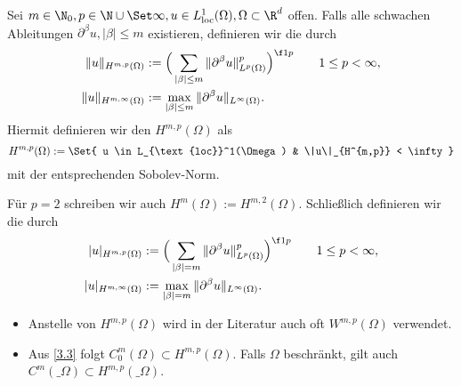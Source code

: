 
\begin{df} \label{3.4}
	Sei $m \in \N_0, p \in \N \cup \Set \infty, u \in L_{\text{loc}}^1(\Omega), \Omega\subset \R^d$ offen.
	Falls alle schwachen Ableitungen $\partial^\beta u, |\beta| \le m$ existieren, definieren wir die  durch
	\begin{align*}
		\|u\|_{H^{m,p}(\Omega)}
		&:= \Big( \sum_{|\beta| \le m} \|\partial^\beta u\|_{L^p(\Omega)}^p \Big)^{\f 1p} \qquad 1 \le p < \infty, \\
		\|u\|_{H^{m,\infty}(\Omega)}
		&:= \max_{|\beta|\le m} \|\partial^\beta u\|_{L^\infty(\Omega)}.
	\end{align*}
	Hiermit definieren wir den  $H^{m,p}(\Omega)$ als
	\[
		H^{m,p}(\Omega)
		:= \Set{ u \in L_{\text{loc}}^1(\Omega) & \|u\|_{H^{m,p}} < \infty}
	\]
	mit der entsprechenden Sobolev-Norm.

	Für $p = 2$ schreiben wir auch $H^m(\Omega) := H^{m,2}(\Omega)$.
	Schließlich definieren wir die  durch
	\begin{align*}
		|u|_{H^{m,p}(\Omega)}
		&:= \Big( \sum_{|\beta| = m} \|\partial^\beta u\|_{L^p(\Omega)}^p \Big)^{\f 1p} \qquad 1 \le p < \infty, \\
		|u|_{H^{m,\infty}(\Omega)}
		&:= \max_{|\beta| = m} \|\partial^\beta u\|_{L^\infty(\Omega)}.
	\end{align*}
	\begin{note}
		\begin{itemize}
			\item
				Anstelle von $H^{m,p}(\Omega)$ wird in der Literatur auch oft $W^{m,p}(\Omega)$ verwendet.
			\item
				Aus \ref{3.3} folgt $C_0^m(\Omega) \subset H^{m,p}(\Omega)$.
				Falls $\Omega$ beschränkt, gilt auch $C^m(\_\Omega) \subset H^{m,p}(\_\Omega)$.
		\end{itemize}
	\end{note}
\end{df}

